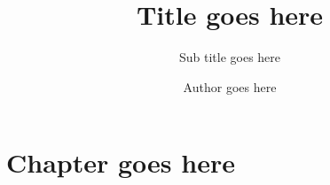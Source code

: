 \documentclass[12pt,a4paper,twoside,openright]{scrbook}
\title{Title goes here}
\subtitle{Sub title goes here}
\author{Author goes here}
\begin{document}
\frontmatter 

\maketitle


\newpage

\tableofcontents

\newpage

\listoffigures

\mainmatter

\pagestyle{fancy} 
\fancyhead[LO]{\nouppercase{\rightmark}}
\fancyhead[RE]{\nouppercase{\leftmark}}
\fancyhead[LE,RO]{\thepage}
\fancyfoot{}

\chapter{Chapter goes here}
\end{document}
